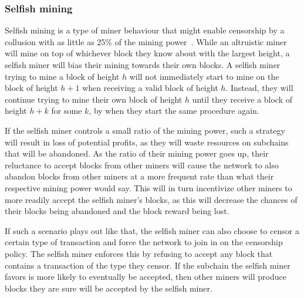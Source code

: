 \subsubsection{Selfish mining}
Selfish mining is a type of miner behaviour that might enable censorship by a collusion with as little as 25\% of the mining power~\cite{eyal_majority_2018}. While an altruistic miner will mine on top of whichever block they know about with the largest height, a selfish miner will bias their mining towards their own blocks. A selfish miner trying to mine a block of height $h$ will not immediately start to mine on the block of height $h+1$ when receiving a valid block of height $h$. Instead, they will continue trying to mine their own block of height $h$ until they receive a block of height $h+k$ for some $k$, by when they start the same procedure again.

If the selfish miner controls a small ratio of the mining power, such a strategy will result in loss of potential profits, as they will waste resources on subchains that will be abandoned. As the ratio of their mining power goes up, their reluctance to accept blocks from other miners will cause the network to also abandon blocks from other miners at a more frequent rate than what their respective mining power would say. This will in turn incentivize other miners to more readily accept the selfish miner's blocks, as this will decrease the chances of their blocks being abandoned and the block reward being lost.

If such a scenario plays out like that, the selfish miner can also choose to censor a certain type of transaction and force the network to join in on the censorship policy. The selfish miner enforces this by refusing to accept any block that contains a transaction of the type they censor. If the subchain the selfish miner favors is more likely to eventually be accepted, then other miners will produce blocks they are sure will be accepted by the selfish miner.
